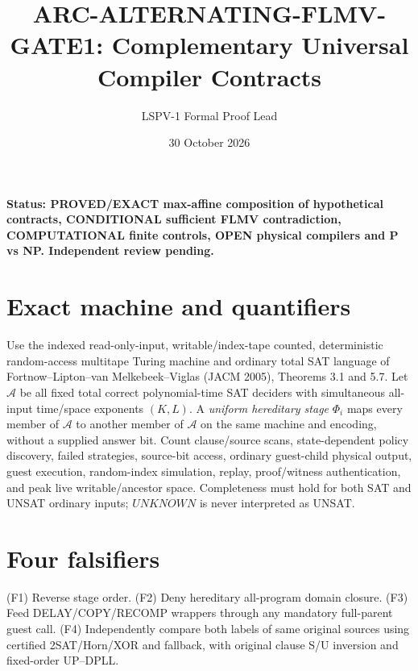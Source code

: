 \documentclass[11pt]{article}
\title{ARC-ALTERNATING-FLMV-GATE1: Complementary Universal Compiler Contracts}
\author{LSPV-1 Formal Proof Lead}
\date{30 October 2026}
\begin{document}
\maketitle
\noindent\textbf{Status: PROVED/EXACT max-affine composition of hypothetical contracts, CONDITIONAL sufficient FLMV contradiction, COMPUTATIONAL finite controls, OPEN physical compilers and P vs NP. Independent review pending.}
\section{Exact machine and quantifiers}
Use the indexed read-only-input, writable/index-tape counted, deterministic random-access multitape Turing machine and ordinary total SAT language of Fortnow--Lipton--van Melkebeek--Viglas (JACM 2005), Theorems 3.1 and 5.7. Let $\mathcal A$ be all fixed total correct polynomial-time SAT deciders with simultaneous all-input time/space exponents $(K,L)$. A \emph{uniform hereditary stage} $\Phi_i$ maps every member of $\mathcal A$ to another member of $\mathcal A$ on the same machine and encoding, without a supplied answer bit. Count clause/source scans, state-dependent policy discovery, failed strategies, source-bit access, ordinary guest-child physical output, guest execution, random-index simulation, replay, proof/witness authentication, and peak live writable/ancestor space. Completeness must hold for both SAT and UNSAT ordinary inputs; $UNKNOWN$ is never interpreted as UNSAT.
\section{Four falsifiers}
(F1) Reverse stage order. (F2) Deny hereditary all-program domain closure. (F3) Feed DELAY/COPY/RECOMP wrappers through any mandatory full-parent guest call. (F4) Independently compare both labels of same original sources using certified 2SAT/Horn/XOR and fallback, with original clause S/U inversion and fixed-order UP--DPLL.
\end{document}
